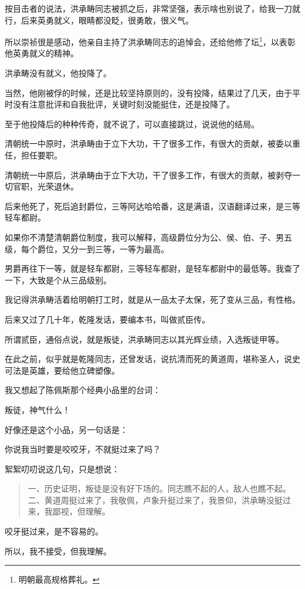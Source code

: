 \begin{multicols}{\theparacolNo}
		按目击者的说法，洪承畴同志被抓之后，非常坚强，表示啥也别说了，给我一刀就行，后来英勇就义，眼睛都没眨，很勇敢，很义气。

		所以崇祯很是感动，他亲自主持了洪承畴同志的追悼会，还给他修了坛\footnote{明朝最高规格葬礼。}，以表彰他英勇就义的精神。

		洪承畴没有就义，他投降了。

		当然，他刚被俘的时候，还是比较坚持原则的，没有投降，结果过了几天，由于平时没有注意批评和自我批评，关键时刻没能挺住，还是投降了。

		至于他投降后的种种传奇，就不说了，可以直接跳过，说说他的结局。

		清朝统一中原时，洪承畴由于立下大功，干了很多工作，有很大的贡献，被委以重任，担任要职。

		清朝统一中原后，洪承畴由于立下大功，干了很多工作，有很大的贡献，被剥夺一切官职，光荣退休。

		后来他死了，死后追封爵位，三等阿达哈哈番，这是满语，汉语翻译过来，是三等轻车都尉。

		如果你不清楚清朝爵位制度，我可以解释，高级爵位分为公、侯、伯、子、男五级，每个爵位，又分一到三等，一等为最高。

		男爵再往下一等，就是轻车都尉，三等轻车都尉，是轻车都尉中的最低等。我查了一下，大致是个从三品级别。

		我记得洪承畴活着给明朝打工时，就是从一品太子太保，死了变从三品，有性格。

		后来又过了几十年，乾隆发话，要编本书，叫做贰臣传。

		所谓贰臣，通俗点说，就是叛徒，洪承畴同志以其光辉业绩，入选叛徒甲等。

		在此之前，似乎就是乾隆同志，还曾发话，说抗清而死的黄道周，堪称圣人，说史可法是英雄，要给他立碑塑像。

		我又想起了陈佩斯那个经典小品里的台词：

		叛徒，神气什么！

		好像还是这个小品，另一句话是：

		你说我当时要是咬咬牙，不就挺过来了吗？

		絮絮叨叨说这几句，只是想说：
		{\footnotesize \begin{quote}
			一、历史证明，叛徒是没有好下场的。同志瞧不起的人，敌人也瞧不起。
			二、黄道周挺过来了，我敬佩，卢象升挺过来了，我景仰，洪承畴没挺过来，我鄙视，但理解。
		\end{quote}}

		咬牙挺过来，是不容易的。

		所以，我不接受，但我理解。


\end{multicols}
